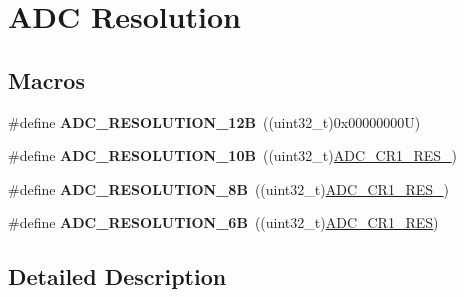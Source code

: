 \hypertarget{group___a_d_c___resolution}{}\section{A\+DC Resolution}
\label{group___a_d_c___resolution}
\subsection*{Macros}
\begin{DoxyCompactItemize}
\item 
\mbox{\label{group___a_d_c___resolution_ga49c8408a1cdbf97bbf29234c3770fa74}} 
\#define {\bfseries A\+D\+C\+\_\+\+R\+E\+S\+O\+L\+U\+T\+I\+O\+N\+\_\+12B}~((uint32\+\_\+t)0x00000000\+U)
\item 
\mbox{\label{group___a_d_c___resolution_ga91289e269eb3080d25301909c0f417e5}} 
\#define {\bfseries A\+D\+C\+\_\+\+R\+E\+S\+O\+L\+U\+T\+I\+O\+N\+\_\+10B}~((uint32\+\_\+t)\mbox{\hyperlink{group___peripheral___registers___bits___definition_gacfc432ddbd2140a92d877f6d9dc52417}{A\+D\+C\+\_\+\+C\+R1\+\_\+\+R\+E\+S\+\_}})
\item 
\mbox{\label{group___a_d_c___resolution_ga39925af93719877bdcc5664e4b95e69a}} 
\#define {\bfseries A\+D\+C\+\_\+\+R\+E\+S\+O\+L\+U\+T\+I\+O\+N\+\_\+8B}~((uint32\+\_\+t)\mbox{\hyperlink{group___peripheral___registers___bits___definition_ga674904864f540043692a5b5ead9fae10}{A\+D\+C\+\_\+\+C\+R1\+\_\+\+R\+E\+S\+\_}})
\item 
\mbox{\label{group___a_d_c___resolution_ga24c5226e05db78b4065f2f187d497b04}} 
\#define {\bfseries A\+D\+C\+\_\+\+R\+E\+S\+O\+L\+U\+T\+I\+O\+N\+\_\+6B}~((uint32\+\_\+t)\mbox{\hyperlink{group___peripheral___registers___bits___definition_ga71e4a4c233895a2e7b6dd3ca6ca849e5}{A\+D\+C\+\_\+\+C\+R1\+\_\+\+R\+ES}})
\end{DoxyCompactItemize}


\subsection{Detailed Description}

